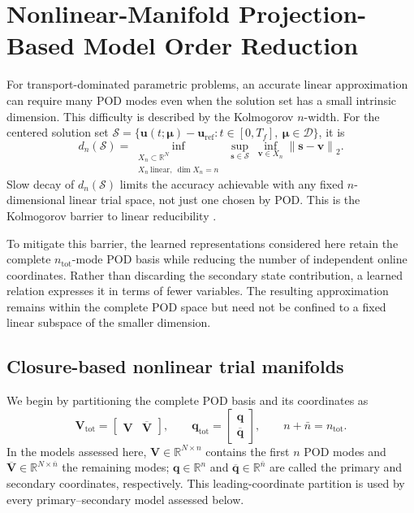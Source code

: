 \documentclass[11pt]{article}
\newcommand{\q}{\mathbf q}
\newcommand{\qbar}{\overline{\mathbf q}}
\newcommand{\qtot}{\mathbf q_{\mathrm{tot}}}
\newcommand{\uvec}{\mathbf u}
\newcommand{\mub}{\bm\mu}
\newcommand{\norm}[1]{\left\lVert #1 \right\rVert}
\begin{document}
\section{Nonlinear-Manifold Projection-Based Model Order Reduction}
\label{sec:learned-representations}
For transport-dominated parametric problems, an accurate linear
approximation can require many POD modes even when the solution set has a
small intrinsic dimension.  This difficulty is described by the
Kolmogorov $n$-width.  For the centered solution set
$\mathcal S=\{\uvec(t;\mub)-\uvec_{\mathrm{ref}}:
t\in[0,T_f],\ \mub\in\mathcal D\}$, it is
\begin{equation}
d_n(\mathcal S)=
\inf_{\substack{X_n\subset\mathbb R^N\\
X_n\ \mathrm{linear},\ \dim X_n=n}}
\ \sup_{\mathbf s\in\mathcal S}\ \inf_{\mathbf v\in X_n}
\norm{\mathbf s-\mathbf v}_2.
\label{eq:kolmogorov-width}
\end{equation}
Slow decay of $d_n(\mathcal S)$ limits the accuracy achievable with any
fixed $n$-dimensional linear trial space, not just one chosen by POD.
This is the Kolmogorov barrier to linear reducibility
\cite{barnett2023neural,aghili2026nonlinear}.

To mitigate this barrier, the learned representations considered here
retain the complete $n_{\mathrm{tot}}$-mode POD basis while reducing the
number of independent online coordinates.  Rather than discarding the
secondary state contribution, a learned relation expresses it in terms of
fewer variables.  The resulting approximation remains within the complete
POD space but need not be confined to a fixed linear subspace of the
smaller dimension.

\subsection{Closure-based nonlinear trial manifolds}
We begin by partitioning the complete POD basis and its coordinates as
\begin{equation}
\mathbf V_{\mathrm{tot}}=
\begin{bmatrix}\mathbf V&\overline{\mathbf V}\end{bmatrix},
\qquad
\qtot=
\begin{bmatrix}\q\\ \qbar\end{bmatrix},
\qquad
n+\bar n=n_{\mathrm{tot}}.
\label{eq:partition}
\end{equation}
In the models assessed here, $\mathbf V\in\mathbb R^{N\times n}$ contains
the first $n$ POD modes and
$\overline{\mathbf V}\in\mathbb R^{N\times\bar n}$ the remaining modes;
$\q\in\mathbb R^n$ and $\qbar\in\mathbb R^{\bar n}$ are called the primary
and secondary coordinates, respectively.  This leading-coordinate
partition is used by every primary--secondary model assessed below.
\end{document}
